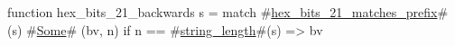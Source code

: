 function hex_bits_21_backwards s =
  match #\hyperref[sailRISCVzhexzybitszy21zymatcheszyprefix]{hex\_bits\_21\_matches\_prefix}#(s) {
      #\hyperref[sailRISCVzSome]{Some}# (bv, n) if n == #\hyperref[sailRISCVzstringzylength]{string\_length}#(s) => bv
  }
